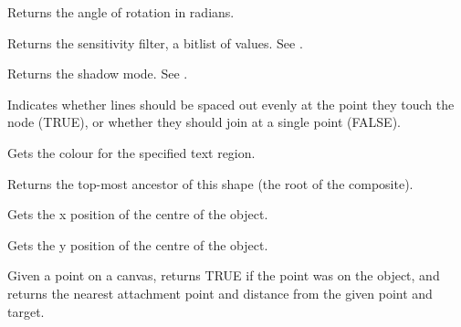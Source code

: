 
Returns the angle of rotation in radians.



Returns the sensitivity filter, a bitlist of values. See .



Returns the shadow mode. See .



Indicates whether lines should be spaced out evenly at the point they touch the node (TRUE), or whether they
should join at a single point (FALSE).



Gets the colour for the specified text region.



Returns the top-most ancestor of this shape (the root of the composite).



Gets the x position of the centre of the object.



Gets the y position of the centre of the object.



Given a point on a canvas, returns TRUE if the point was on the object, and returns
the nearest attachment point and distance from the given point and target.


